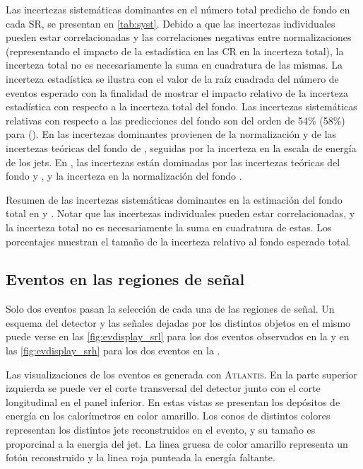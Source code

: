Las incertezas sistemáticas dominantes en el número total predicho de fondo en
cada SR, se presentan en \cref{tab:syst}.
Debido a que las incertezas individuales pueden estar correlacionadas y las
correlaciones negativas entre normalizaciones (representando el impacto de la
estadística en las CR en la incerteza total), la incerteza total no es
necesariamente la suma en cuadratura de las mismas. La incerteza estadística se
ilustra con el valor de la raíz cuadrada del número de eventos esperado con la
finalidad de mostrar el impacto relativo de la incerteza estadística con
respecto a la incerteza total del fondo. Las incertezas sistemáticas relativas
con respecto a las predicciones del fondo son del orden de 54\% (58\%) para
{\SRL} (\SRH). En {\SRL} las incertezas dominantes provienen de la normalización
y de las incertezas teóricas del fondo de {\ttgam}, seguidas por la incerteza en
la escala de energía de los jets. En {\SRH}, las
incertezas están dominadas por las incertezas teóricas del fondo {\zgam} y
{\gjet}, y la incerteza en la normalización del fondo {\wgam}.


\begin{table}[!htb]
  \centering

  \caption{Resumen de las incertezas sistemáticas dominantes en la estimación del fondo total
    en {\SRL} y {\SRH}. Notar que las incertezas individuales pueden estar correlacionadas, y la incerteza
    total no es necesariamente la suma en cuadratura de estas. Los porcentajes muestran el tamaño
    de la incerteza relativo al fondo esperado total.}
  \label{tab:syst}

  
\end{table}



\subsection{Eventos en las regiones de señal}

Solo dos eventos pasan la
selección de cada una de las regiones de señal. Un esquema del detector y las
se\~nales dejadas por los distintos objetos en el mismo puede verse en las
\cref{fig:evdisplay_srl} para los dos eventos observados en la {\SRL} y en las
\cref{fig:evdisplay_srh} para los dos eventos en la {\SRH}.

Las visualizaciones de los eventos es generada con
\textsc{Atlantis}\cite{atlantis}. En la parte superior izquierda se puede ver el
corte transversal del detector junto con el corte longitudinal en el panel
inferior. En estas vistas se presentan los depósitos de energía en los
calorímetros en color amarillo. Los conos de distintos colores representan los
distintos jets reconstruidos en el evento, y su tama\~no es proporcinal a la
energia del jet. La linea gruesa de color amarillo representa un fotón
reconstruido y la linea roja punteada la energía faltante.



